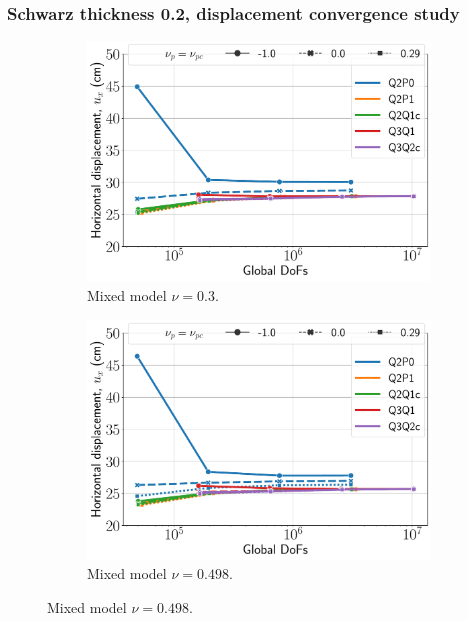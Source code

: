 \documentclass{beamer}
\begin{document}
\begin{frame}
	\frametitle{Schwarz thickness 0.2, displacement convergence study}
	\begin{figure}[H]
		\begin{subfigure}{.5\textwidth}
			\centering
			\includegraphics[width=.8\textwidth]{../figs/u-schwarz1-mixed-0.3.pdf}
			\caption{Mixed model $\nu = 0.3$.}
		\end{subfigure}%
		\begin{subfigure}{.5\textwidth}
			\centering
			\includegraphics[width=.8\textwidth]{../figs/u-schwarz1-mixed-0.498.pdf}
			\caption{Mixed model $\nu = 0.498$.}
		\end{subfigure}
	\end{figure}
\end{frame}
\end{document}
